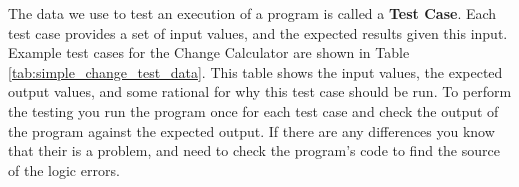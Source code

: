 The data we use to test an execution of a program is called a \textbf{Test Case}. Each test case provides a set of input values, and the expected results given this input. Example test cases for the Change Calculator are shown in Table \ref{tab:simple_change_test_data}. This table shows the input values, the expected output values, and some rational for why this test case should be run. To perform the testing you run the program once for each test case and check the output of the program against the expected output. If there are any differences you know that their is a problem, and need to check the program's code to find the source of the logic errors.





